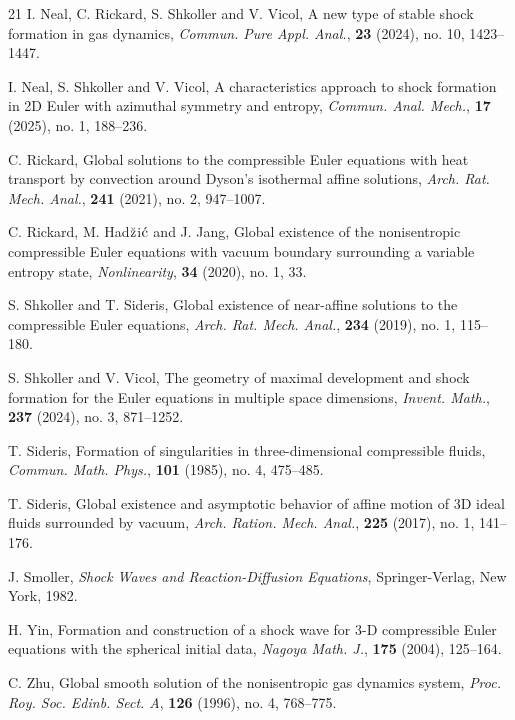 \documentclass[11pt,reqno]{article}
\numberwithin{equation}{section}
\begin{document}
\begin{thebibliography}{21}
 I. Neal, C. Rickard, S. Shkoller and V. Vicol, A new type of stable shock formation
    in gas dynamics, \emph{Commun. Pure Appl. Anal.}, {\bf 23} (2024), no. 10, 1423--1447.

 I. Neal, S. Shkoller and V. Vicol, A characteristics approach to shock formation in
    2D Euler with azimuthal symmetry and entropy, \emph{Commun. Anal. Mech.}, {\bf 17} (2025), no. 1, 188--236.

 C. Rickard, Global solutions to the compressible Euler equations with heat transport by convection around Dyson's isothermal affine solutions, \emph{Arch. Rat. Mech. Anal.}, {\bf 241} (2021), no. 2, 947--1007.

 C. Rickard, M. Had${\rm \breve{z}}$i${\rm \acute{c}}$ and J. Jang, Global existence of the nonisentropic compressible Euler equations with vacuum boundary surrounding a variable entropy state, \emph{Nonlinearity}, {\bf 34} (2020), no. 1, 33.

 S. Shkoller and T. Sideris, Global existence of near-affine solutions to the compressible Euler equations, \emph{Arch. Rat. Mech. Anal.}, {\bf 234} (2019), no. 1, 115--180.

 S. Shkoller and V. Vicol, The geometry of maximal development and shock formation for the Euler equations in multiple space dimensions, \emph{Invent. Math.}, {\bf 237} (2024), no. 3, 871--1252.

 T. Sideris, Formation of singularities in three-dimensional compressible fluids, \emph{Commun. Math. Phys.}, {\bf 101} (1985), no. 4, 475--485.

 T. Sideris, Global existence and asymptotic behavior of affine motion of 3D ideal
    fluids surrounded by vacuum, \emph{Arch. Ration. Mech. Anal.}, {\bf 225} (2017), no. 1, 141--176.

 J. Smoller, \emph{Shock Waves and Reaction-Diffusion Equations}, Springer-Verlag, New York, 1982.

 H. Yin, Formation and construction of a shock wave for 3-D compressible Euler equations with the spherical initial data, \emph{Nagoya Math. J.}, {\bf 175} (2004), 125--164.

 C. Zhu, Global smooth solution of the nonisentropic gas dynamics system, \emph{Proc. Roy. Soc. Edinb. Sect. A}, {\bf 126} (1996), no. 4, 768--775.

\end{thebibliography}
\end{document}
